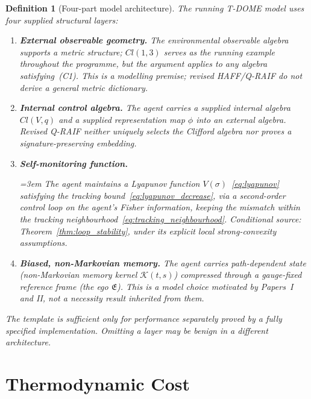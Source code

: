 \documentclass[12pt]{article}
\newtheorem{definition}[theorem]{Definition}
\begin{document}
\begin{definition}[Four-part model architecture]
\label{def:four_part_template}
The running T-DOME model uses four supplied structural layers:
\begin{enumerate}
\item[\textup{(I)}] \textbf{External observable geometry.}
  The environmental observable algebra supports a
  metric structure; $Cl(1,3)$ serves as the running
  example throughout the programme, but the argument
  applies to any algebra satisfying~(C1).
  This is a modelling premise; revised HAFF/Q-RAIF do not derive a
  general metric dictionary.
\item[\textup{(II)}] \textbf{Internal control algebra.}
  The agent carries a supplied internal algebra $Cl(V,q)$ and a
  supplied representation map $\phi$ into an external algebra.
  Revised Q-RAIF neither uniquely selects the Clifford algebra nor
  proves a signature-preserving embedding.
\item[\textup{(III)}] \textbf{Self-monitoring function.}
  {\emergencystretch=3em
  The agent maintains a Lyapunov function
  $V(\sigma)$~\eqref{eq:lyapunov} satisfying
  the tracking
  bound~\eqref{eq:lyapunov_decrease},
  via a second-order control loop on the agent's
  Fisher information, keeping the mismatch within
  the tracking
  neighbourhood~\eqref{eq:tracking_neighbourhood}.
  \emph{Conditional source:} Theorem~\ref{thm:loop_stability}, under
  its explicit local strong-convexity assumptions.\par}
\item[\textup{(IV)}] \textbf{Biased, non-Markovian memory.}
  The agent carries path-dependent state
  (non-Markovian memory kernel $\mathcal{K}(t,s)$)
  compressed through a gauge-fixed reference frame
  (the ego $\mathfrak{E}$).
  This is a model choice motivated by Papers~I and II, not a necessity
  result inherited from them.
\end{enumerate}
The template is sufficient only for performance separately proved by a
fully specified implementation.  Omitting a layer may be benign in a
different architecture.
\end{definition}

\section{Thermodynamic Cost}
\label{sec:cost}

\end{document}
